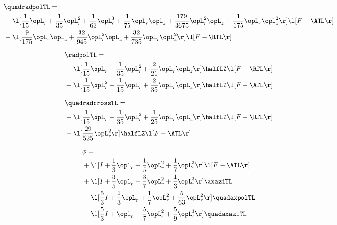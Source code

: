 \begin{alignat}{2} 
\label{eq:quadradpolTL_1} 
& \quadradpolTL = \\ 
& - \l[ \frac{1}{15} \opL_r + \frac{1}{35} \opL_r^{2} + \frac{1}{63} \opL_r^{3} + \frac{1}{75} \opL_r \opL_z + \frac{179}{3675} \opL_r^{2} \opL_z + \frac{1}{175} \opL_r \opL_z^{2}  \r] \l[ F - \ATL \r] \nonumber \\ 
& - \l[ \frac{9}{175} \opL_r \opL_z + \frac{32}{945} \opL_r^{2} \opL_z + \frac{32}{735} \opL_r \opL_z^{2}  \r] \l[ F - \RTL \r] \nonumber \\ 
\end{alignat} 


\begin{alignat}{2} 
\label{eq:linradpolTL_1} 
& \radpolTL = \\ 
& + \l[ \frac{1}{15} \opL_r + \frac{1}{35} \opL_r^{2} + \frac{2}{21} \opL_r \opL_z  \r] \halfLZ \l[ F - \RTL \r] \nonumber \\ 
& + \l[ \frac{1}{15} \opL_r^{2} + \frac{1}{15} \opL_r + \frac{2}{35} \opL_r \opL_z  \r] \halfLZ \l[ F - \ATL \r] \nonumber \\ 
\end{alignat} 


\begin{alignat}{2} 
\label{eq:quadradcrossTL_1} 
& \quadradcrossTL = \\ 
& - \l[ \frac{1}{15} \opL_r + \frac{1}{35} \opL_r^{2} + \frac{1}{25} \opL_r \opL_z  \r] \halfLZ \l[ F - \RTL \r] \nonumber \\ 
& - \l[ \frac{29}{525} \opL_r^{2}  \r] \halfLZ \l[ F - \ATL \r] \nonumber \\ 
\end{alignat} 


\begin{alignat}{2} 
\label{eq:scalarFlux_1} 
& \phi = \\ 
& + \l[ I + \frac{1}{3} \opL_r + \frac{1}{5} \opL_r^{2} + \frac{1}{7} \opL_r^{3}  \r] \l[ F - \ATL \r] \nonumber \\ 
& + \l[ I + \frac{3}{5} \opL_r + \frac{3}{7} \opL_r^{2} + \frac{1}{3} \opL_r^{3}  \r] \axaziTL \nonumber \\ 
& - \l[ \frac{5}{3} I + \frac{1}{3} \opL_r + \frac{1}{7} \opL_r^{2} + \frac{5}{63} \opL_r^{2}  \r] \quadaxpolTL \nonumber \\ 
& - \l[ \frac{5}{3} I + \opL_r + \frac{5}{7} \opL_r^{2} + \frac{5}{9} \opL_r^{3}  \r] \quadaxaziTL \nonumber \\ 
\end{alignat} 


